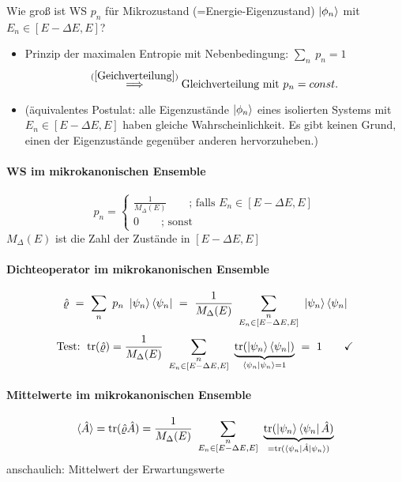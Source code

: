 Wie groß ist WS $p_n$ für Mikrozustand (=Energie-Eigenzustand) $\ket{\phi_n}$ mit $E_n \in [E-\Delta E,E]$?
\begin{itemize}
    \item[] Prinzip der maximalen Entropie mit Nebenbedingung: $\sum_n \ p_n = 1$
    \begin{equation}
        \stackrel{\equa{Geichverteilung}}{\Longrightarrow} \text{Gleichverteilung mit } p_n = const.
    \end{equation}
    \item[] (äquivalentes Postulat: alle Eigenzustände $\ket{\phi_n}$ eines isolierten Systems mit $E_n \in [E-\Delta E,E]$ haben gleiche Wahrscheinlichkeit. Es gibt keinen Grund, einen der Eigenzustände gegenüber anderen hervorzuheben.)
\end{itemize}

\paragraph{WS im mikrokanonischen Ensemble}
\begin{equation}
    p_n = \begin{cases}
        \frac{1}{M_{\Delta}(E)} \qquad \text{; falls } E_n \in [E-\Delta E,E] \\
        0 \qquad \text{; sonst}
    \end{cases}
\end{equation}
$M_{\Delta}(E)$ ist die Zahl der Zustände in $[E-\Delta E,E]$

\paragraph{Dichteoperator im mikrokanonischen Ensemble}
\begin{equation}
    \hat{\varrho} \ = \ \sum_n \ p_n \ \ket{\psi_n} \bra{\psi_n} \ = \ \frac{1}{M_{\Delta}(E)} \ \sum_{\substack{n \\ E_n \in [E-\Delta E,E]}} \ \ket{\psi_n} \bra{\psi_n}
\end{equation}
\begin{equation}
    \text{Test: } \trace(\hat{\varrho}) = \frac{1}{M_{\Delta}(E)} \ \sum_{\substack{n \\ E_n \in [E-\Delta E,E]}} \ \underbrace{\trace(\ket{\psi_n} \bra{\psi_n})}_{\braket{\psi_n}=1} \ = \ 1 \qquad \checkmark
\end{equation}

\paragraph{Mittelwerte im mikrokanonischen Ensemble}
\begin{equation}
    \langle \hat{A} \rangle = \trace(\hat{\varrho} \hat{A}) = \frac{1}{M_{\Delta}(E)} \ \sum_{\substack{n \\ E_n \in [E-\Delta E,E]}} \ \underbrace{\trace(\ket{\psi_n} \bra{\psi_n} \hat{A})}_{= \trace(\bra{\psi_n} \hat{A} \ket{\psi_n})}
\end{equation}
anschaulich: Mittelwert der Erwartungswerte

